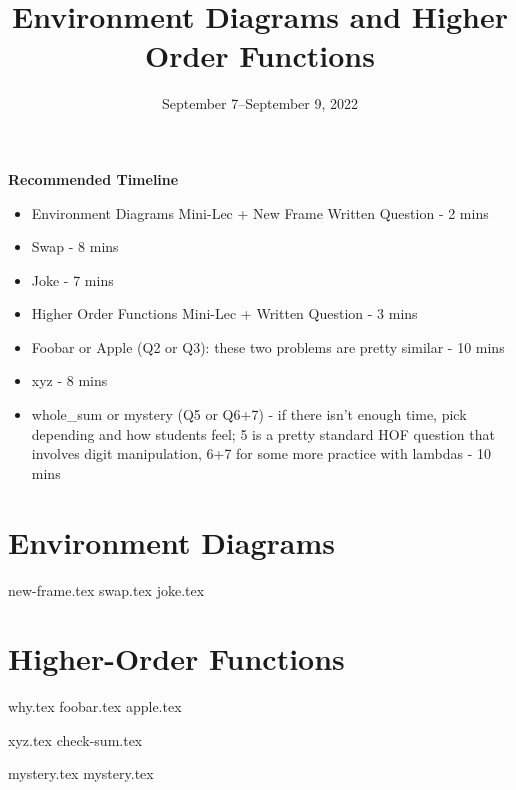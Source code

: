 \documentclass{exam}
\title{Environment Diagrams \titlebreak and Higher Order Functions}
\date{September 7--September 9, 2022}
\begin{document}
\maketitle

\begin{blocksection}
\begin{guide}
\textbf{Recommended Timeline}
\begin{itemize}
    \item Environment Diagrams Mini-Lec + New Frame Written Question - 2 mins
    \item Swap - 8 mins
    \item Joke - 7 mins
    \item Higher Order Functions Mini-Lec + Written Question - 3 mins
    \item Foobar or Apple (Q2 or Q3): these two problems are pretty similar - 10 mins
    \item xyz - 8 mins
    \item whole\_sum or mystery (Q5 or Q6+7) - if there isn't enough time, pick depending and how students feel;
    5 is a pretty standard HOF question that involves digit manipulation, 6+7 for some more practice with lambdas - 10 mins
\end{itemize}
\end{guide}
\end{blocksection}


\section{Environment Diagrams}

\begin{questions}
{new-frame.tex}
{swap.tex}
{joke.tex}
\end{questions}

\section{Higher-Order Functions}
\begin{questions}
{why.tex}
{foobar.tex}
{apple.tex}

{xyz.tex}
{check-sum.tex}

{mystery.tex}
{mystery.tex}
\clearpage

\end{questions}
\end{document}
